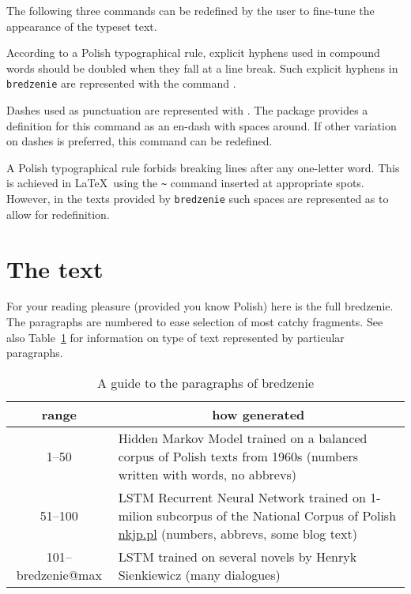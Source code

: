 \documentclass{ltxdoc}
\makeatletter
\edef\MaxBredzenie{\csname bredzenie@max\endcsname}
\makeatother
\begin{document}
The following three commands can be redefined by the user to fine-tune
the appearance of the typeset text.
\begin{macro}{\BredzenieHyphen}
According to a Polish typographical rule, explicit hyphens used in
compound words should be doubled when they fall at a line break.  Such
explicit hyphens in \texttt{bredzenie} are represented with the
command .
\end{macro}

\begin{macro}{\BredzenieDash}
Dashes used as punctuation are represented with .
The package provides a definition  for this command as an en-dash with
spaces around.  If other variation on dashes is preferred, this
command can be redefined.
\end{macro}

\begin{macro}{\BredzenieNbsp}
  A Polish typographical rule forbids breaking lines after any
  one-letter word.  This is achieved in \LaTeX\ using the \verb|~|
  command inserted at appropriate spots.  However, in the texts
  provided by \texttt{bredzenie} such spaces are represented as
   to allow for redefinition.
\end{macro}


\section{The text}

For your reading pleasure (provided you know Polish) here is the full
bredzenie.  The paragraphs are numbered to ease selection of most
catchy fragments. See also Table~\ref{tab:index} for information on
type of text represented by particular paragraphs.
\def\tablename{Table}
\begin{table}[t]
  \caption{A guide to the paragraphs of bredzenie}
  \label{tab:index}
  \begin{center}
    \begin{tabular}{cp{9cm}}
      \toprule
      range & \multicolumn{1}{c}{how generated}\\\midrule
      1–50 & Hidden Markov Model trained on a balanced corpus of
             Polish texts from 1960s (numbers written with words, no abbrevs)\\
      51–100 & LSTM Recurrent Neural Network trained on 1-milion
            subcorpus of the National Corpus of Polish \url{nkjp.pl}
               (numbers, abbrevs, some blog text)\\
      101–\MaxBredzenie & LSTM trained on several novels by Henryk
                       Sienkiewicz (many dialogues)\\
      \bottomrule
    \end{tabular}
  \end{center}
\end{table}


\bigskip
{}
\makeatletter
{}
\let\bredzenie@orig\bredzenie@minmax
\def\bredzenie@minmax{\stepcounter{numbred}%
  \leavevmode\llap{\textsuperscript{\bfseries\thenumbred\quad\indent}}%
  \bredzenie@orig
}

\bredzenie{1-\MaxBredzenie}
\end{document}
